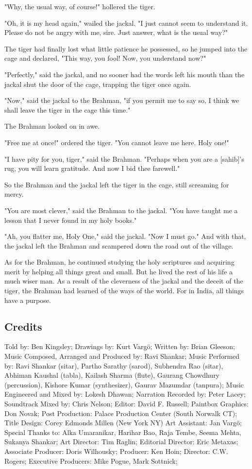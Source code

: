 "Why, the usual way, of course!" hollered the tiger.

"Oh, it is my head again," wailed the jackal. "I just cannot seem to understand it. Please do not be angry with me, sire. Just answer, what is the usual way?"

The tiger had finally lost what little patience he possessed, so he jumped into the cage and declared, "This way, you fool! Now, you understand now?"

"Perfectly," said the jackal, and no sooner had the words left his mouth than the jackal shut the door of the cage, trapping the tiger once again.

"Now," said the jackal to the Brahman, "if you permit me to say so, I think we shall leave the tiger in the cage this time."

The Brahman looked on in awe.

"Free me at once!" ordered the tiger. "You cannot leave me here. Holy one!"

"I have pity for you, tiger," said the Brahman. "Perhaps when you are a [sahib]'s rug, you will learn gratitude. And now I bid thee farewell."

So the Brahman and the jackal left the tiger in the cage, still screaming for mercy.

"You are most clever," said the Brahman to the jackal. "You have taught me a lesson that I never found in my holy books."

"Ah, you flatter me, Holy One," said the jackal. "Now I must go." And with that, the jackal left the Brahman and scampered down the road out of the village.

As for the Brahman, he continued studying the holy scriptures and acquiring merit by helping all things great and small. But he lived the rest of his life a much wiser man. As a result of the cleverness of the jackal and the deceit of the tiger, the Brahman had learned of the ways of the world. For in India, all things have a purpose.

\subsection{Credits}

Told by: Ben Kingsley;
Drawings by: Kurt Vargö;
Written by: Brian Gleeson;
Music Composed, Arranged and Produced by: Ravi Shankar;
Music Performed by: Ravi Shankar (sitar), Partho Sarathy (sarod), Subhendra Rao (sitar), Abhiman Kaushal (tabla), Kailash Sharma (flute), Gaurang Chowdhury (percussion), Kishore Kumar (synthesizer), Gaurav Mazumdar (tanpura);
Music Engineered and Mixed by: Lokesh Dhawan;
Narration Recorded by: Peter Lacey;
Soundtrack Mixed by: Chris Nelson;
Editor: David F. Russell;
Paintbox Graphics: Don Novak;
Post Production: Palace Production Center (South Norwalk CT);
Title Design: Corey Edmonds Millen (New York NY)
Art Assistant: Jan Vargö;
Special Thanks to: Alka Umaranikar, Harihar Bao, Raja Tembe, Seema Mehta, Sukanya Shankar;
Art Director: Tim Raglin;
Editorial Director: Eric Metaxas;
Associate Producer: Doris Wilhousky;
Producer: Ken Hoin;
Director: C.W. Rogers;
Executive Producers: Mike Pogue, Mark Sottnick;